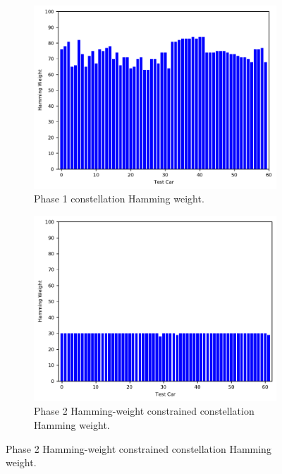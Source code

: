 \documentclass[aps,pra,twocolumn,superscriptaddress,groupedaddress]{revtex4}  %
\begin{document}
\begin{figure}
  \centering
  \begin{subfigure}[b]{.475\textwidth}
    \centering
    \includegraphics[width=\textwidth]{figures/phase2/2-prod-hamming.pdf}  
    \caption{Phase 1 constellation Hamming weight.}
    \label{fig:sub-first}
  \end{subfigure}
  \hfill
  \begin{subfigure}[b]{.475\textwidth}
    \centering
    \includegraphics[width=\textwidth]{figures/phase2/2p-prod-hamming.pdf}  
    \caption{Phase 2 Hamming-weight constrained constellation Hamming weight.}
    \label{fig:sub-second}
  \end{subfigure}

\end{figure}
\end{document}
